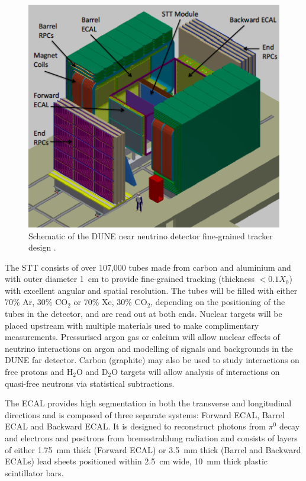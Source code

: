 \begin{figure}
  \centering
  \includegraphics[width=12cm]{DUNENearDetector.png}
  \caption[Schematic of the DUNE near neutrino detector fine-grained tracker design.]{Schematic of the DUNE near neutrino detector fine-grained tracker design \cite{DUNECDR4}.}
  \label{fig:DUNENearDetector}
\end{figure}

The STT consists of over 107,000 tubes made from carbon and aluminium and with outer diameter 1~cm to provide fine-grained tracking (thickness $<0.1X_0$) with excellent angular and spatial resolution.  The tubes will be filled with either 70\% Ar, 30\% CO$_2$ or 70\% Xe, 30\% CO$_2$, depending on the positioning of the tubes in the detector, and are read out at both ends.  Nuclear targets will be placed upstream with multiple materials used to make complimentary measurements.  Pressurised argon gas or calcium will allow nuclear effects of neutrino interactions on argon and modelling of signals and backgrounds in the DUNE far detector.  Carbon (graphite) may also be used to study interactions on free protons and H$_2$O and D$_2$O targets will allow analysis of interactions on quasi-free neutrons via statistical subtractions.

The ECAL provides high segmentation in both the transverse and longitudinal directions and is composed of three separate systems: Forward ECAL, Barrel ECAL and Backward ECAL.  It is designed to reconstruct photons from $\pi^0$ decay and electrons and positrons from bremsstrahlung radiation and consists of layers of either 1.75~mm thick (Forward ECAL) or 3.5~mm thick (Barrel and Backward ECALs) lead sheets positioned within 2.5~cm wide, 10~mm thick plastic scintillator bars.

